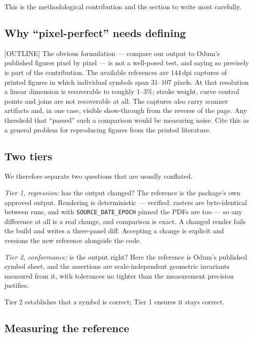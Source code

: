 This is the methodological contribution and the section to write most carefully.

\subsection{Why ``pixel-perfect'' needs defining}

[OUTLINE] The obvious formulation --- compare our output to Odum's published
figures pixel by pixel --- is not a well-posed test, and saying so precisely is
part of the contribution. The available references are $144$\,dpi captures of
printed figures in which individual symbols span $31$--$107$ pixels. At that
resolution a linear dimension is recoverable to roughly $1$--$3\%$; stroke
weight, curve control points and joins are not recoverable at all. The captures
also carry scanner artifacts and, in one case, visible show-through from the
reverse of the page. Any threshold that ``passed'' such a comparison would be
measuring noise. Cite this as a general problem for reproducing figures from the
printed literature.

\subsection{Two tiers}

We therefore separate two questions that are usually conflated.

\emph{Tier 1, regression:} has the output changed? The reference is the
package's own approved output. Rendering is deterministic --- verified: rasters
are byte-identical between runs, and with \texttt{SOURCE\_DATE\_EPOCH} pinned
the PDFs are too --- so any difference at all is a real change, and comparison
is exact. A changed render fails the build and writes a three-panel diff.
Accepting a change is explicit and versions the new reference alongside the code.

\emph{Tier 2, conformance:} is the output right? Here the reference is Odum's
published symbol sheet, and the assertions are scale-independent geometric
invariants measured from it, with tolerances no tighter than the measurement
precision justifies.

Tier 2 establishes that a symbol is correct; Tier 1 ensures it stays correct.

\subsection{Measuring the reference}

